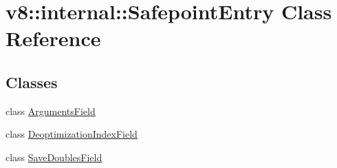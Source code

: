 \hypertarget{classv8_1_1internal_1_1SafepointEntry}{}\section{v8\+:\+:internal\+:\+:Safepoint\+Entry Class Reference}
\label{classv8_1_1internal_1_1SafepointEntry}
\subsection*{Classes}
\begin{DoxyCompactItemize}
\item 
class \mbox{\hyperlink{classv8_1_1internal_1_1SafepointEntry_1_1ArgumentsField}{Arguments\+Field}}
\item 
class \mbox{\hyperlink{classv8_1_1internal_1_1SafepointEntry_1_1DeoptimizationIndexField}{Deoptimization\+Index\+Field}}
\item 
class \mbox{\hyperlink{classv8_1_1internal_1_1SafepointEntry_1_1SaveDoublesField}{Save\+Doubles\+Field}}
\end{DoxyCompactItemize}
